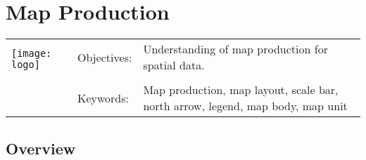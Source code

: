 

\section{Map Production}\label{sec:mapproduction}
\begin{tabular}{p{3.5cm}p{6cm}p{6cm}}
\multirow{2}{*}{\texttt{[image: logo]}} & Objectives: &
Understanding of map production for spatial data. \\
& & \\
& Keywords: & 
Map production, map layout, scale bar, north arrow, legend, map body, map
unit  \\
\hline
\end{tabular}

\subsection{Overview}\label{subsec:overview}



